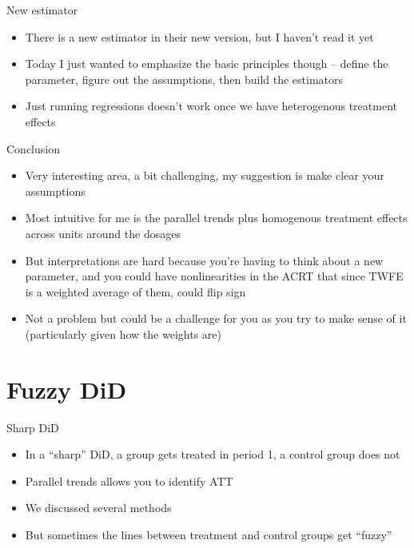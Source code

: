 \documentclass{beamer}
\begin{document}
\begin{frame}{New estimator}

\begin{itemize}

\item There is a new estimator in their new version, but I haven't read it yet
\item Today I just wanted to emphasize the basic principles though -- define the parameter, figure out the assumptions, then build the estimators
\item Just running regressions doesn't work once we have heterogenous treatment effects

\end{itemize}

\end{frame}


\begin{frame}{Conclusion}

\begin{itemize}
\item Very interesting area, a bit challenging, my suggestion is make clear your assumptions 
\item Most intuitive for me is the parallel trends plus homogenous treatment effects across units around the dosages
\item But interpretations are hard because you're having to think about a new parameter, and you could have nonlinearities in the ACRT that since TWFE is a weighted average of them, could flip sign 
\item Not a problem but could be a challenge for you as you try to make sense of it (particularly given how the weights are)
\end{itemize}

\end{frame}


\section{Fuzzy DiD}





\begin{frame}{Sharp DiD}

\begin{itemize}
\item In a ``sharp'' DiD, a group gets treated in period 1, a control group does not
\item Parallel trends allows you to identify ATT
\item We discussed several methods
\item But sometimes the lines between treatment and control groups get ``fuzzy''
\end{itemize}

\end{frame}
\end{document}
